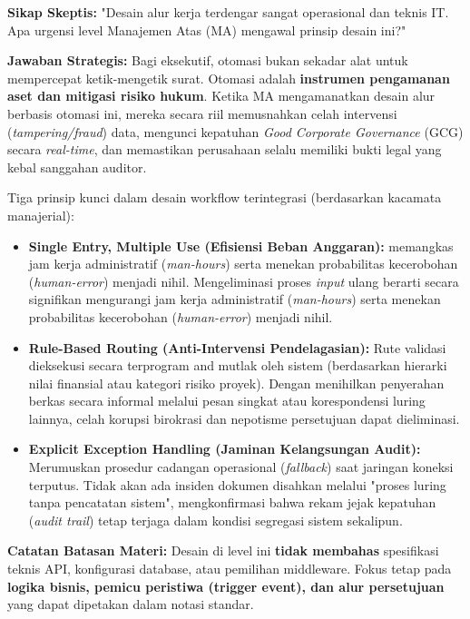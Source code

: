 \documentclass[12pt,a4paper]{report}
\begin{document}
\begin{plnbox}
\small
\textbf{Sikap Skeptis:} "Desain alur kerja terdengar sangat operasional dan teknis IT. Apa urgensi level Manajemen Atas (MA) mengawal prinsip desain ini?"

\textbf{Jawaban Strategis:} Bagi eksekutif, otomasi bukan sekadar alat untuk mempercepat ketik-mengetik surat. Otomasi adalah \textbf{instrumen pengamanan aset dan mitigasi risiko hukum}. Ketika MA mengamanatkan desain alur berbasis otomasi ini, mereka secara riil memusnahkan celah intervensi (\textit{tampering/fraud}) data, mengunci kepatuhan \textit{Good Corporate Governance} (GCG) secara \textit{real-time}, dan memastikan perusahaan selalu memiliki bukti legal yang kebal sanggahan auditor.
\end{plnbox}

Tiga prinsip kunci dalam desain workflow terintegrasi (berdasarkan kacamata manajerial):
\begin{itemize}[leftmargin=*]
    \item \textbf{Single Entry, Multiple Use (Efisiensi Beban Anggaran):} memangkas jam kerja administratif (\textit{man-hours}) serta menekan probabilitas kecerobohan (\textit{human-error}) menjadi nihil. Mengeliminasi proses \textit{input} ulang berarti secara signifikan mengurangi jam kerja administratif (\textit{man-hours}) serta menekan probabilitas kecerobohan (\textit{human-error}) menjadi nihil.
    \item \textbf{Rule-Based Routing (Anti-Intervensi Pendelagasian):} Rute validasi dieksekusi secara terprogram and mutlak oleh sistem (berdasarkan hierarki nilai finansial atau kategori risiko proyek). Dengan menihilkan penyerahan berkas secara informal melalui pesan singkat atau korespondensi luring lainnya, celah korupsi birokrasi dan nepotisme persetujuan dapat dieliminasi.
    \item \textbf{Explicit Exception Handling (Jaminan Kelangsungan Audit):} Merumuskan prosedur cadangan operasional (\textit{fallback}) saat jaringan koneksi terputus. Tidak akan ada insiden dokumen disahkan melalui "proses luring tanpa pencatatan sistem", mengkonfirmasi bahwa rekam jejak kepatuhan (\textit{audit trail}) tetap terjaga dalam kondisi segregasi sistem sekalipun.
\end{itemize}

\begin{warnbox}
\textbf{Catatan Batasan Materi:} Desain di level ini \textbf{tidak membahas} spesifikasi teknis API, konfigurasi database, atau pemilihan middleware. Fokus tetap pada \textbf{logika bisnis, pemicu peristiwa (trigger event), dan alur persetujuan} yang dapat dipetakan dalam notasi standar.
\end{warnbox}
\end{document}
